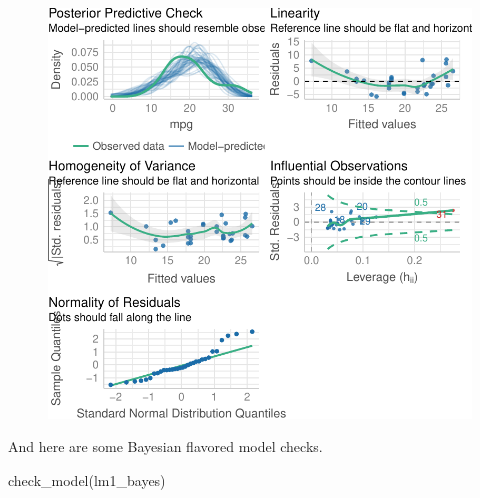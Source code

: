 \documentclass[
  letterpaper,
  DIV=11,
  numbers=noendperiod]{scrreprt}
\newenvironment{Shaded}{\begin{snugshade}}{\end{snugshade}}
\newcommand{\FunctionTok}[1]{\textcolor[rgb]{0.28,0.35,0.67}{#1}}
\newcommand{\NormalTok}[1]{\textcolor[rgb]{0.00,0.23,0.31}{#1}}
\theoremstyle{definition}
\theoremstyle{definition}
\theoremstyle{remark}
\begin{document}
\begin{figure}[H]

{\centering \includegraphics[width=1\textwidth,height=\textheight]{./regression1_files/figure-pdf/checkmodel-lm1-freq-1.pdf}

}

\end{figure}

And here are some Bayesian flavored model checks.

\begin{Shaded}
\begin{Highlighting}[]
\FunctionTok{check\_model}\NormalTok{(lm1\_bayes)}
\end{Highlighting}
\end{Shaded}
\end{document}
